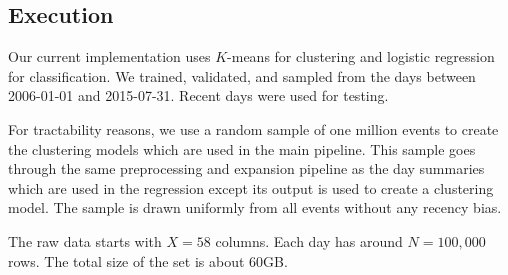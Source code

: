 \subsection{Execution}

Our current implementation uses $K$-means for clustering and logistic regression for classification. We trained, validated, and sampled from the days between 2006-01-01 and 2015-07-31. Recent days were used for testing.

For tractability reasons, we use a random sample of one million events to create the clustering models which are used in the main pipeline. This sample goes through the same preprocessing and expansion pipeline as the day summaries which are used in the regression except its output is used to create a clustering model. The sample is drawn uniformly from all events without any recency bias.

The raw data starts with $X=58$ columns. Each day has around $N=100,000$ rows. The total size of the set is about 60GB. %


